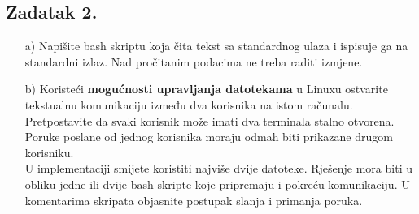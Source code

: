 \documentclass{exam}
\begin{document}
\subsection*{Zadatak 2.}
\begin{itemize}
\item[a)] Napišite bash skriptu koja čita tekst sa
  standardnog ulaza i ispisuje ga na standardni izlaz.
  Nad pročitanim podacima ne treba raditi izmjene.
\item[b)] Koristeći \textbf{mogućnosti upravljanja
  datotekama} u Linuxu ostvarite tekstualnu komunikaciju između dva korisnika na
istom računalu. Pretpostavite da svaki korisnik može imati dva terminala stalno
otvorena. Poruke poslane od jednog korisnika moraju odmah biti prikazane drugom
korisniku.\\ U implementaciji smijete koristiti najviše dvije datoteke. Rješenje
mora biti u obliku jedne ili dvije bash skripte koje pripremaju i pokreću
komunikaciju. U komentarima skripata objasnite postupak slanja i primanja
poruka.
\end{itemize}
\end{document}
